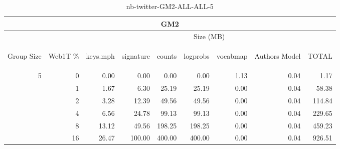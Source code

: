 \begin{center}
\begin{table}[htbp] 
 \begin{center}
\begin{tabular}{ | r | r | r | r | r | r | r | r | r |}
\hline
\multicolumn{9}{|c|}{GM2}\\
\hline
 & & \multicolumn{7}{|c|}{Size (MB)}\\ \cline{3-9}
\begin{sideways}Group Size\end{sideways} & \begin{sideways}Web1T \% \end{sideways} & \begin{sideways}keys.mph\end{sideways} & \begin{sideways}signature\end{sideways} & \begin{sideways}counts\end{sideways} & \begin{sideways}logprobs\end{sideways} & \begin{sideways}vocabmap\end{sideways} & \begin{sideways}Authors Model \end{sideways} & \begin{sideways}TOTAL\end{sideways}\\
\hline
\multirow{5}{*}{5}
 & 0 & 0.00 & 0.00 & 0.00 & 0.00 & 1.13 & 0.04 & 1.17\\ \cline{2-9}
 & 1 & 1.67 & 6.30 & 25.19 & 25.19 & 0.00 & 0.04 & 58.38\\ \cline{2-9}
 & 2 & 3.28 & 12.39 & 49.56 & 49.56 & 0.00 & 0.04 & 114.84\\ \cline{2-9}
 & 4 & 6.56 & 24.78 & 99.13 & 99.13 & 0.00 & 0.04 & 229.65\\ \cline{2-9}
 & 8 & 13.12 & 49.56 & 198.25 & 198.25 & 0.00 & 0.04 & 459.23\\ \cline{2-9}
 & 16 & 26.47 & 100.00 & 400.00 & 400.00 & 0.00 & 0.04 & 926.51\\ \cline{2-9}
\hline
\end{tabular}
\caption{nb-twitter-GM2-ALL-ALL-5}
\label{table:nb-twitter-GM2-ALL-ALL-5}
\end{center}
 \end{table}
\end{center}

